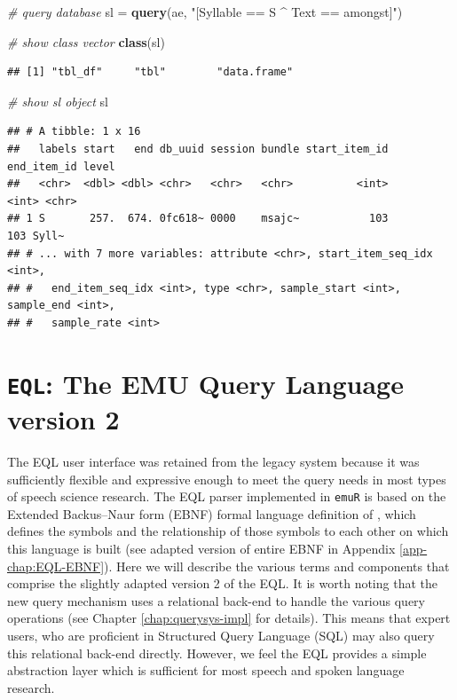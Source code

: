 \documentclass[]{book}
\newenvironment{Shaded}{\begin{snugshade}}{\end{snugshade}}
\newcommand{\CommentTok}[1]{\textcolor[rgb]{0.56,0.35,0.01}{\textit{#1}}}
\newcommand{\KeywordTok}[1]{\textcolor[rgb]{0.13,0.29,0.53}{\textbf{#1}}}
\newcommand{\NormalTok}[1]{#1}
\newcommand{\StringTok}[1]{\textcolor[rgb]{0.31,0.60,0.02}{#1}}
\begin{document}
\begin{Shaded}
\begin{Highlighting}[]
\CommentTok{# query database}
\NormalTok{sl =}\StringTok{ }\KeywordTok{query}\NormalTok{(ae, }\StringTok{"[Syllable == S ^ Text == amongst]"}\NormalTok{)}

\CommentTok{# show class vector}
\KeywordTok{class}\NormalTok{(sl)}
\end{Highlighting}
\end{Shaded}

\begin{verbatim}
## [1] "tbl_df"     "tbl"        "data.frame"
\end{verbatim}

\begin{Shaded}
\begin{Highlighting}[]
\CommentTok{# show sl object}
\NormalTok{sl}
\end{Highlighting}
\end{Shaded}

\begin{verbatim}
## # A tibble: 1 x 16
##   labels start   end db_uuid session bundle start_item_id end_item_id level
##   <chr>  <dbl> <dbl> <chr>   <chr>   <chr>          <int>       <int> <chr>
## 1 S       257.  674. 0fc618~ 0000    msajc~           103         103 Syll~
## # ... with 7 more variables: attribute <chr>, start_item_seq_idx <int>,
## #   end_item_seq_idx <int>, type <chr>, sample_start <int>, sample_end <int>,
## #   sample_rate <int>
\end{verbatim}

\hypertarget{eql-the-emu-query-language-version-2}{%
\section{\texorpdfstring{\texttt{EQL}: The EMU Query Language version 2}{EQL: The EMU Query Language version 2}}\label{eql-the-emu-query-language-version-2}}

The EQL user interface was retained from the legacy system because it was sufficiently flexible and expressive enough to meet the query needs in most types of speech science research. The EQL parser implemented in \texttt{emuR} is based on the Extended Backus--Naur form (EBNF) \citep{garshol:2003a} formal language definition of \citet{john:2012a}, which defines the symbols and the relationship of those symbols to each other on which this language is built (see adapted version of entire EBNF in Appendix \ref{app-chap:EQL-EBNF}). Here we will describe the various terms and components that comprise the slightly adapted version 2 of the EQL. It is worth noting that the new query mechanism uses a relational back-end to handle the various query operations (see Chapter \ref{chap:querysys-impl} for details). This means that expert users, who are proficient in Structured Query Language (SQL) may also query this relational back-end directly. However, we feel the EQL provides a simple abstraction layer which is sufficient for most speech and spoken language research.
\end{document}
